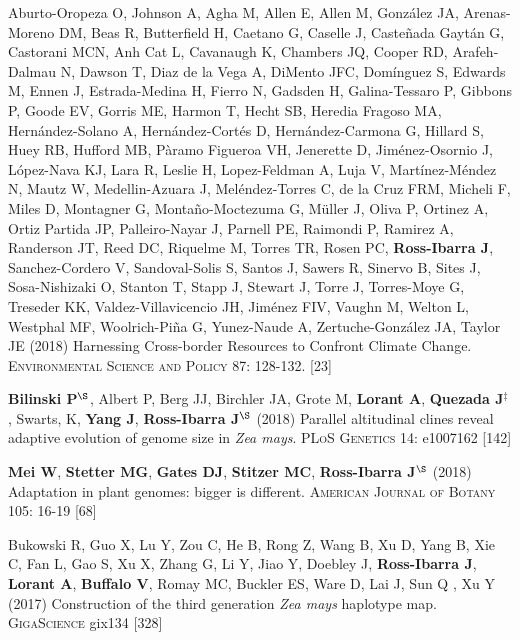 \documentclass[letterpaper,10pt]{article}
\begin{document}
\begin{etaremune}
\item  Aburto-Oropeza O, Johnson A, Agha M, Allen E,  Allen M,  Gonz\'{a}lez JA, Arenas-Moreno DM, Beas R, Butterfield H, Caetano G, Caselle J, Caste\~{n}ada Gayt\'{a}n G, Castorani MCN, Anh Cat L, Cavanaugh K, Chambers JQ, Cooper RD, Arafeh-Dalmau N, Dawson T, Diaz de la Vega A, DiMento JFC, Dom\'{i}nguez S, Edwards M, Ennen J, Estrada-Medina H, Fierro N, Gadsden H, Galina-Tessaro P, Gibbons P, Goode EV, Gorris ME, Harmon T, Hecht SB, Heredia Fragoso MA, Hern\'{a}ndez-Solano A, Hern\'{a}ndez-Cort\'{e}s D, Hern\'{a}ndez-Carmona G, Hillard S, Huey RB, Hufford MB, P\`{a}ramo Figueroa VH, Jenerette D, Jim\'{e}nez-Osornio J, L\'{o}pez-Nava KJ, Lara R, Leslie H, Lopez-Feldman A, Luja V, Mart\'{i}nez-M\'{e}ndez N, Mautz W, Medellin-Azuara J, Mel\'{e}ndez-Torres C, de la Cruz FRM,  Micheli F, Miles D, Montagner G, Monta\~{n}o-Moctezuma G, M\"{u}ller J, Oliva P, Ortinez A, Ortiz Partida JP, Palleiro-Nayar J, Parnell PE, Raimondi P, Ramirez A, Randerson JT, Reed DC, Riquelme M, Torres TR, Rosen PC, {\bf Ross-Ibarra J}, Sanchez-Cordero V, Sandoval-Solis S, Santos J, Sawers R, Sinervo B, Sites J,  Sosa-Nishizaki O, Stanton T, Stapp J, Stewart J, Torre J,  Torres-Moye G, Treseder KK, Valdez-Villavicencio JH, Jim\'{e}nez FIV, Vaughn M, Welton L, Westphal MF, Woolrich-Pi\~{n}a G,  Yunez-Naude A, Zertuche-Gonz\'{a}lez JA, Taylor JE (2018)
Harnessing Cross-border Resources to Confront Climate Change.  \textsc{Environmental Science and Policy}  87: 128-132.
 [23]\\

\item \textbf{Bilinski P}$^\S$, Albert P, Berg JJ, Birchler JA, Grote M, \textbf{Lorant A}, \textbf{Quezada J}$^\ddagger$, Swarts, K, \textbf{Yang J}, \textbf{Ross-Ibarra J}$^\S$ (2018) Parallel altitudinal clines reveal adaptive evolution of genome size in \textit{Zea mays}. \textsc{PLoS Genetics} 14: e1007162
 [142]\\

\item {\bf Mei W}, {\bf Stetter MG}, {\bf Gates DJ}, {\bf Stitzer MC}, {\bf Ross-Ibarra J}$^\S$ (2018) Adaptation in plant genomes: bigger is different.  \textsc{American Journal of Botany} 105: 16-19
 [68]\\

\item Bukowski R, Guo X, Lu Y, Zou C, He B, Rong Z, Wang B,  Xu D,  Yang B, Xie C,  Fan L, Gao S, Xu X, Zhang G, Li Y, Jiao Y, Doebley J, {\bf Ross-Ibarra J}, {\bf Lorant A}, {\bf Buffalo V}, Romay MC, Buckler ES, Ware D, Lai J, Sun Q , Xu Y (2017) Construction of the third generation \emph{Zea mays} haplotype map. \textsc{GigaScience} gix134
 [328]\\


\end{etaremune}
\end{document}
